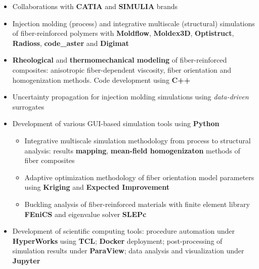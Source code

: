 \documentclass[10pt,a4paper,ragged2e,withhyper]{altacv}
\begin{document}
\begin{paracol}{2}

  \begin{itemize}
    \item Collaborations with \textbf{CATIA} and \textbf{SIMULIA} brands
  \end{itemize}

  \divider

  \begin{itemize}
    \item Injection molding (process) and integrative multiscale (structural) simulations of fiber-reinforced polymers with \textbf{Moldflow}, \textbf{Moldex3D}, \textbf{Optistruct}, \textbf{Radioss}, \textbf{code\_aster} and \textbf{Digimat}
    \item \textbf{Rheological} and \textbf{thermomechanical modeling} of fiber-reinforced composites: anisotropic fiber-dependent viscosity, fiber orientation and homogenization methods. Code development using \textbf{C++}
    \item Uncertainty propagation for injection molding simulations using \emph{data-driven} surrogates
    \item Development of various GUI-based simulation tools using \textbf{Python}
      \begin{itemize}
        \item Integrative multiscale simulation methodology from process to structural analysis: results \textbf{mapping}, \textbf{mean-field homogenizaton} methods of fiber composites
        \item Adaptive optimization methodology of fiber orientation model parameters using \textbf{Kriging} and \textbf{Expected Improvement}
        \item Buckling analysis of fiber-reinforced materials with finite element library \textbf{FEniCS} and eigenvalue solver \textbf{SLEPc}
      \end{itemize}
    \item Development of scientific computing tools: procedure automation under \textbf{HyperWorks} using \textbf{TCL}; \textbf{Docker} deployment; post-processing of simulation results under \textbf{ParaView}; data analysis and visualization under \textbf{Jupyter}
  \end{itemize}


\end{paracol}
\end{document}
